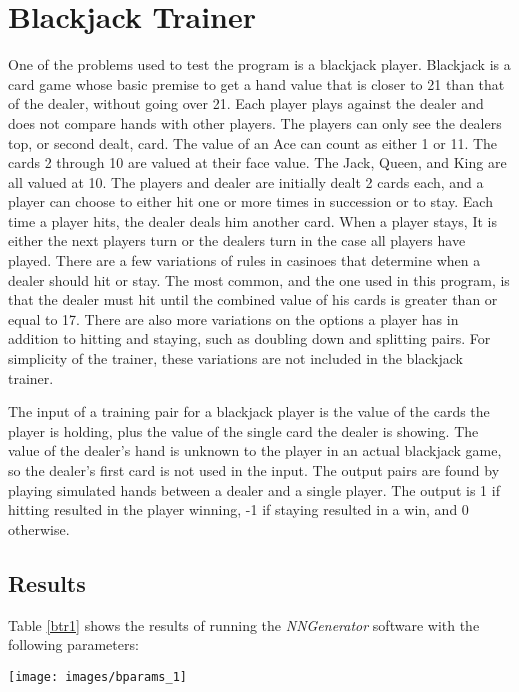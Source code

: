 \chapter[Blackjack Trainer]{Blackjack Trainer}
One of the problems used to test the program is a blackjack player. 
Blackjack is a card game whose basic premise to get a hand value that is closer to 21 than that of the dealer, without going over 21. 
Each player plays against the dealer and does not compare hands with other players. 
The players can only see the dealers top, or second dealt, card. 
The value of an Ace can count as either 1 or 11. 
The cards 2 through 10 are valued at their face value. 
The Jack, Queen, and King are all valued at 10. 
The players and dealer are initially dealt 2 cards each, and a player can choose to either hit one or more times in succession or to stay. 
Each time a player hits, the dealer deals him another card. 
When a player stays, It is either the next players turn or the dealers turn in the case all players have played. 
There are a few variations of rules in casinoes that determine when a dealer should hit or stay. 
The most common, and the one used in this program, is that the dealer must hit until the combined value of his cards is greater than or equal to 17. 
There are also more variations on the options a player has in addition to hitting and staying, such as doubling down and splitting pairs. 
For simplicity of the trainer, these variations are not included in the blackjack trainer.

The input of a training pair for a blackjack player is the value of the cards the player is holding, plus the value of the single card the dealer is showing. 
The value of the dealer's hand is unknown to the player in an actual blackjack game, so the dealer's first card is not used in the input. 
The output pairs are found by playing simulated hands between a dealer and a single player. 
The output is 1 if hitting resulted in the player winning, -1 if staying resulted in a win, and 0 otherwise.

\section{Results}

Table \ref{btr1} shows the results of running the {\it NNGenerator} software with the following parameters:

\begin{center}
\texttt{[image: images/bparams\_1]}
\end{center}

